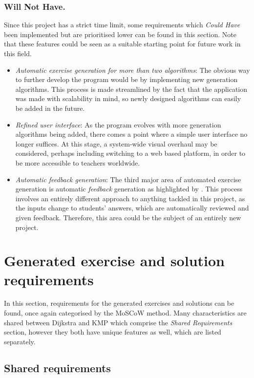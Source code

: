 \documentclass{l4proj}
\begin{document}
\subsubsection{Will Not Have.}
Since this project has a strict time limit, some requirements which \emph{Could Have} been implemented but are prioritised lower can be found in this section. Note that these features could be seen as a suitable starting point for future work in this field.
\begin{itemize}
	\item
	\emph{Automatic exercise generation for more than two algorithms}: The obvious way to further develop the program would be by implementing new generation algorithms. This process is made streamlined by the fact that the application was made with scalability in mind, so newly designed algorithms can easily be added in the future.
	\item
	\emph{Refined user interface}: As the program evolves with more generation algorithms being added, there comes a point where a simple user interface no longer suffices. At this stage, a system-wide visual overhaul may be considered, perhaps including switching to a web based platform, in order to be more accessible to teachers worldwide. 
	\item
	\emph{Automatic feedback generation}: The third major area of automated exercise generation is automatic \emph{feedback} generation as highlighted by \cite{Sad12}. This process involves an entirely different approach to anything tackled in this project, as the inputs change to students' answers, which are automatically reviewed and given feedback. Therefore, this area could be the subject of an entirely new project.
\end{itemize}

\section{Generated exercise and solution requirements}

In this section, requirements for the generated exercises and solutions can be found, once again categorised by the MoSCoW method. Many characteristics are shared between Dijkstra and KMP which comprise the \emph{Shared Requirements} section, however they both have unique features as well, which are listed separately.

\subsection{Shared requirements}
\end{document}
